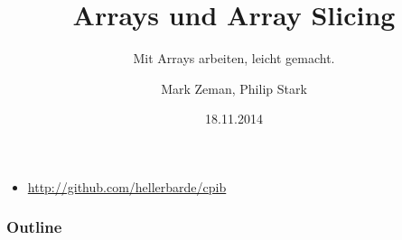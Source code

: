 \documentclass[t]{beamer}
\title{Arrays und Array Slicing}
\subtitle{Mit Arrays arbeiten, leicht gemacht.}
\author{Mark Zeman, Philip Stark}
\institute{FHNW - Compilerbau}
\date{18.11.2014}
\begin{document}
\begin{frame}
\titlepage
\begin{itemize}
\item 	\url{http://github.com/hellerbarde/cpib}
\end{itemize}
\end{frame}

\begin{frame}
\frametitle{Outline}
\tableofcontents
\end{frame}


\end{document}
